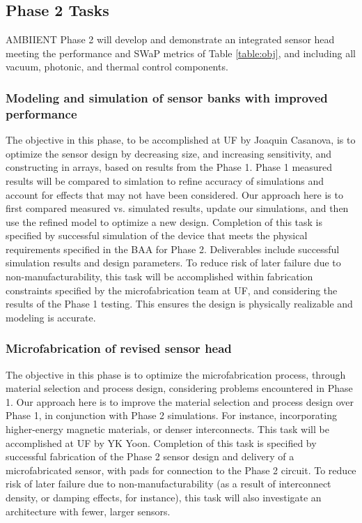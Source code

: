 \subsection{Phase 2 Tasks}
  
AMBIIENT Phase 2 will develop and demonstrate an integrated sensor head meeting the
performance and SWaP metrics of Table \ref{table:obj}, and including all vacuum, photonic, and thermal
control components.

\subsubsection{Modeling and simulation of sensor banks with improved performance}\label{sec:p2:em}

The objective in this phase, to be accomplished at UF by Joaquin Casanova, is to optimize the sensor design by decreasing size, and increasing sensitivity, and constructing in arrays, based on results from the Phase 1. Phase 1 measured results will be compared to simlation to refine accuracy of simulations and account for effects that may not have been considered. Our approach here is to first compared measured vs. simulated results, update our simulations, and then use the refined model to optimize a new design. Completion of this task is specified by successful simulation of the device that meets the physical requirements specified in the BAA for Phase 2. Deliverables include successful simulation results and design parameters. To reduce risk of later failure due to non-manufacturability, this task will be accomplished within fabrication constraints specified by the microfabrication team at UF, and considering the results of the Phase 1 testing. This ensures the design is physically realizable and modeling is accurate.

\subsubsection{Microfabrication of revised sensor head}\label{sec:p2:mf}

The objective in this phase is to optimize the microfabrication process, through material selection and process design, considering problems encountered in Phase 1. Our approach here is to improve the material selection and process design over Phase 1, in conjunction with Phase 2 simulations. For instance, incorporating higher-energy magnetic materials, or denser interconnects. This task will be accomplished at UF by YK Yoon. Completion of this task is specified by successful fabrication of the Phase 2 sensor design and delivery of a microfabricated sensor, with pads for connection to the Phase 2 circuit. To reduce risk of later failure due to non-manufacturability (as a result of interconnect density, or damping effects, for instance), this task will also investigate an architecture with fewer, larger sensors.

